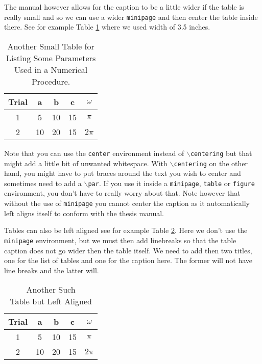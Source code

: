 The manual however
allows for the caption to be a little wider if the table is really
small and so we can use a wider \texttt{minipage} and then center the
table inside there.  See for example Table \ref{wtab} where we used
width of 3.5 inches.
% 
\begin{table}[hbt]
  \centering
  \begin{minipage}{3.5in}
    \centering
    \caption{Another Small Table for Listing Some Parameters Used in a
      Numerical Procedure\label{wtab}.}
    \begin{tabular}{|c||c|c|c|c||}    \hline
      Trial &	a  &  b & c & $\omega$ \\ \hline \hline
      1 & 5 & 10  & 15 & $\pi$ \\ \hline
      2 & 10 & 20  & 15 & $2\pi$ \\ \hline
    \end{tabular}
  \end{minipage}
\end{table}

Note that you can use the \texttt{center} environment instead of
\texttt{$\backslash$centering} but that might add a little bit of
unwanted whitespace.  With \texttt{$\backslash$centering} on the other
hand, you might have to put braces around the text you wish to center
and sometimes need to add a \texttt{$\backslash$par}.  If you use it
inside a \texttt{minipage}, \texttt{table} or \texttt{figure}
environment, you don't have to really worry about that.  Note however
that without the use of \texttt{minipage} you cannot center the
caption as it automatically left aligns itself to conform with the
thesis manual.

Tables can also be left aligned see for example Table \ref{ltab}.
Here we don't use the \texttt{minipage} environment, but we must then
add linebreaks so that the table caption does not go wider then the
table itself.  We need to add then two titles, one for the list of
tables and one for the caption here.  The former will not have line
breaks and the latter will.
% 
\begin{table}[hbt]
  \caption[
  Another Such Table but Left Aligned]{
    Another Such\\Table but Left Aligned\label{ltab}}
  \begin{tabular}{|c||c|c|c|c||}    \hline
    Trial &	a  &  b & c & $\omega$ \\ \hline \hline
    1 & 5 & 10  & 15 & $\pi$ \\ \hline
    2 & 10 & 20  & 15 & $2\pi$ \\ \hline
  \end{tabular}
\end{table}

